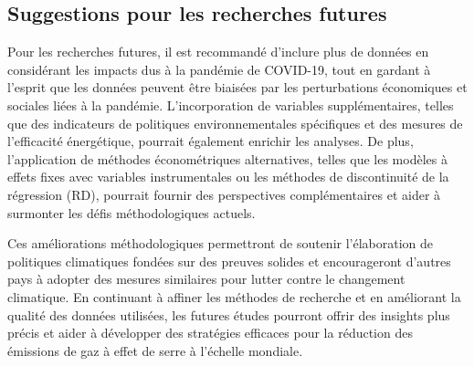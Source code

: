 \subsection{Suggestions pour les recherches futures}
\label{subsec:suggestion}

 
Pour les recherches futures, il est recommandé d'inclure plus de données en considérant les impacts dus à la pandémie de COVID-19, tout en gardant à l'esprit que les données peuvent être biaisées par les perturbations économiques et sociales liées à la pandémie. L'incorporation de variables supplémentaires, telles que des indicateurs de politiques environnementales spécifiques et des mesures de l’efficacité énergétique, pourrait également enrichir les analyses. De plus, l'application de méthodes économétriques alternatives, telles que les modèles à effets fixes avec variables instrumentales ou les méthodes de discontinuité de la régression (RD), pourrait fournir des perspectives complémentaires et aider à surmonter les défis méthodologiques actuels.

Ces améliorations méthodologiques permettront de soutenir l'élaboration de politiques climatiques fondées sur des preuves solides et encourageront d'autres pays à adopter des mesures similaires pour lutter contre le changement climatique. En continuant à affiner les méthodes de recherche et en améliorant la qualité des données utilisées, les futures études pourront offrir des insights plus précis et aider à développer des stratégies efficaces pour la réduction des émissions de gaz à effet de serre à l'échelle mondiale.